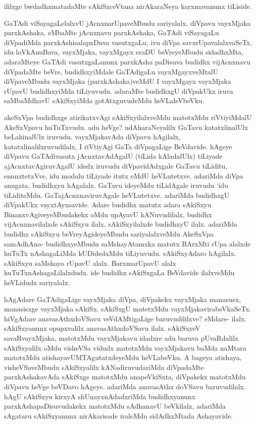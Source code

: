 \begin{center}
ililxge bwdadhxmatadaMte sAkiSxceVtana nirAkaraNeya karxmavanunx tiLiside. 
\end{center}


\begin{artha}
GaTAdi viSayagaLelalxvU jAcnxnarUpaveMbudu sariyalalx, diVpavu vayxMjaka parxkAshaka, eMbaMte jAcnxnavu parxkAshaka, GaTAdi viSayagaLu diVpadiMda parxkAshisalapxDuva vasutxgaLu, ivu diVpa savxrUpavalalxvaSeTx, idu loVkAnuBava, vayxMjaka, vayxMgayx eraDU beVreyeMbudu sidadhxMta, adaraMteye GaTAdi vasutxgaLanunx parxkAsha paDisuva budidhx vijAcnxnavu diVpadaMte beVre, budidhxyiMdale GaTAdigaLu vayxMgayxveMtalU diVpaveMbudu vayxMjaka (parxkAshaka)veMdU I vayxMgayx vayxMjaka rUpavU budidhxyiMda tiLiyuvudu. adaraMte budidhxgU diVpakUkx iruva saMbaMdhavU sAkiSxyiMda gotAtxguvudeMdu heVLaleVbeVku. 
\end{artha}

\begin{artha}
akeSxVpa budidhxge atirikatxvAgi sAkiSxyilalxveMdu matotxMdu riVtiyiMdalU AkeSxVpavu huTuTxvudu. adu heVge? udAharaNeyalilx GaTavu katatxlinalUlx beLakinalUlx iruvudu. vayxMjakavAda diVpavu hAgilalx, katatxlinalilxruvudilalx, I riVtiyAgi GaTa diVpagaLige BeVdavide. hAgeye diVpavu GaTAdivasutx jAcnxtavAdAgalU (tiLida kAladalUlx) tiLiyade ajAcnxtavAgiruvAgalU idedx iruvudu diVpavidAdxgale GaTavu tiLiditu, enunxtetxVve, idu modalu tiLiyade itutx eMdU heVLutetxve. adariMda diVpa anugata, budidhxyu hAgalalx. GaTavu ideyeMdu tiLidAgale iruvudu `idu tiLiditeMdu. GaTajAcnxnaviruvAgale heVLutetxve. adariMda budidhxgU diVpakUkx vayxtAyxsavide. Adare budidhx matutx adara sAkiSxyu BinanxvAgiveyeMbudakekx oMdu upAyavU kANuvudilalx, budidhx vijAcnxnavilalxde sAkiSxyu ilalx, sAkiSxyilalxde budidhxyU ilalx. adariMda budidhx sAkiSxyu beVreyAgideyeMbudu sariyalalxveMdu AkeSxVpa samAdhAna- budidhxyeMbudu saMshayAtamxka matutx BArxMti rUpa alalxde huTuTx nAshagaLiMda kUDidedxMdu tiLiyuvudu. sAkiSxyAdaro hAgilalx. sAkiSxyu saMshaya rUpavU alalx. BarxmarUpavU alalx huTuTxnAshagaLilalxdudx. ide budidhx sAkiSxgaLa BeVdavide ilalxveMdu heVLidudx sariyalalx. 
\end{artha}%

\begin{artha}
hAgAdare GaTAdigaLige vayxMjaka diVpa, diVpakekx vayxMjaka manasusx, manasisxge vayxMjaka sAkiSx, sAkiSxgU matetxMdu vayxMjakavirabeVkaSeTx. hiVgAdare anavasAthxdoVSavu veVdAMtigaLige baruvudililxve? eMdare- ilalx. sAkiSxyanunx opupxvalilx anavasAthxdoVSavu ilalx. sAkiSxyeV savaRvayxMjaka, matotxMdu vayxMjakavu idadxre adu baruva pUvaRdalilx sAkiSxyalilx oMdu visheVSa vidudx matotxMdu vayxMjakavu baMda naMtara matotxMdu atishayavUMTAgutatxdeyeMdu heVLabeVku. A bageya atishaya, visheVSaveMbudu sAkiSxyalilx kANadiruvudariMda diVpadaMte parxkAshakavAda sAkiSxge matotxMdu anapeVkiSxta, diVpakekx matotxMdu diVpavu heVge beVDavo hAgeye. adariMda anavasAthx doVSavu baruvudilalx. hAgU sAkiSxyu kirxyA shUnayxnAdadxriMda budidhxyanunx parxkAshapaDisuvudakekx matotxMdu sAdhanavU beVkilalx, adariMda sAgataru sAkiSxyanunx nirAkarisade iraleMdu sidAdhxMtada Ashayavide. 
\end{artha}

